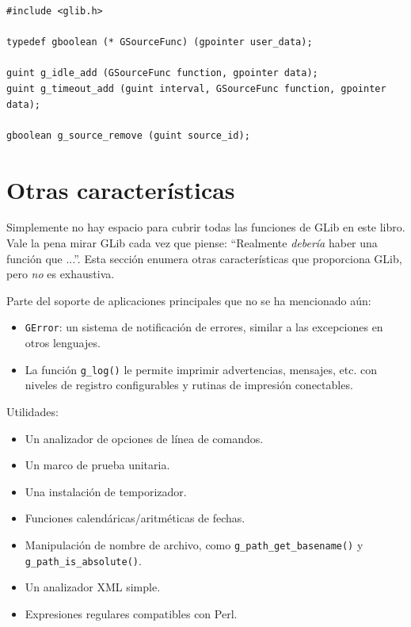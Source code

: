 \begin{lstlisting}[style=GLib/GTK, caption={Inactivos y tiempos de espera}, label=glib-idle-timeout]
#include <glib.h>

typedef gboolean (* GSourceFunc) (gpointer user_data);

guint g_idle_add (GSourceFunc function, gpointer data);
guint g_timeout_add (guint interval, GSourceFunc function, gpointer data);

gboolean g_source_remove (guint source_id);
\end{lstlisting}

\section{Otras características}

Simplemente no hay espacio para cubrir todas las funciones de GLib en este libro. Vale la pena mirar GLib cada vez que piense: ``Realmente \emph{debería} haber una función que ...''. Esta sección enumera otras características que proporciona GLib, pero \emph{no} es exhaustiva.

Parte del soporte de aplicaciones principales que no se ha mencionado aún:
\begin{itemize}
    \item \lstinline{GError}: un sistema de notificación de errores, similar a las excepciones en otros lenguajes.
    \item La función \lstinline{g_log()} le permite imprimir advertencias, mensajes, etc. con niveles de registro configurables y rutinas de impresión conectables.
\end{itemize}

Utilidades:
\begin{itemize}
    \item Un analizador de opciones de línea de comandos.
    \item Un marco de prueba unitaria.
    \item Una instalación de temporizador.
    \item Funciones calendáricas/aritméticas de fechas.
    \item Manipulación de nombre de archivo, como \lstinline{g_path_get_basename()} y \lstinline{g_path_is_absolute()}.
    \item Un analizador XML simple.
    \item Expresiones regulares compatibles con Perl.
\end{itemize}

